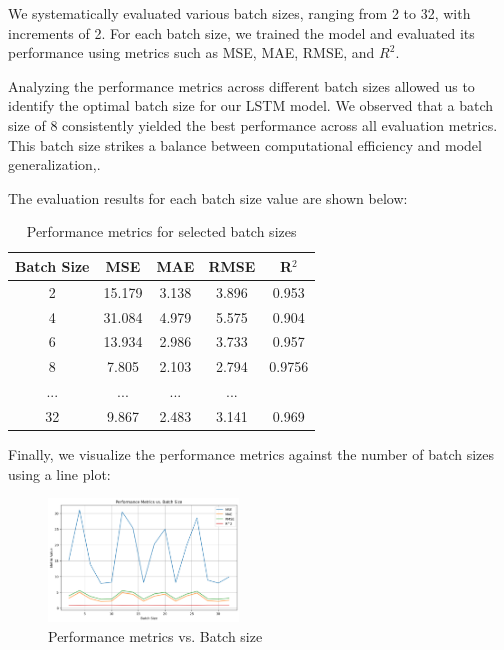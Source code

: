 \documentclass[10pt,twocolumn,letterpaper]{article}
\begin{document}
We systematically evaluated various batch sizes, ranging from 2 to 32, with increments 
of 2. For each batch size, we trained the model and evaluated its performance using 
metrics such as MSE, MAE, RMSE, and $R^2$.

Analyzing the performance metrics across different batch sizes allowed us to identify 
the optimal batch size for our LSTM model. We observed that a batch size of 8 
consistently yielded the best performance across all evaluation metrics. This batch size 
strikes a balance between computational efficiency and model generalization,.

The evaluation results for each batch size value are shown below:

\begin{table}[H]
    \centering
    \begin{tabular}{ccccc}
        \toprule
        \textbf{Batch Size} & \textbf{MSE} & \textbf{MAE} & \textbf{RMSE} & \textbf{R$^2$} \\
        \midrule
        2  & 15.179 & 3.138 & 3.896 & 0.953 \\
        4  & 31.084 & 4.979 & 5.575 & 0.904 \\
        6  & 13.934 & 2.986 & 3.733 & 0.957 \\
        8 & 7.805 & 2.103 & 2.794 & 0.9756 \\
        ... & ... & ... & ... \\
        32 & 9.867  & 2.483 & 3.141 & 0.969 \\
        \bottomrule
    \end{tabular}
    \caption{Performance metrics for selected batch sizes}
    \label{tab:selected_batch_sizes}
\end{table}

Finally, we visualize the performance metrics against the number of batch sizes using a line plot:

\begin{figure}[H]
\centering
\includegraphics[width=0.45\textwidth]{batch_metrics_plot.png}
\caption{Performance metrics vs. Batch size}
\label{fig:batch_size_performance}
\end{figure}
\end{document}
